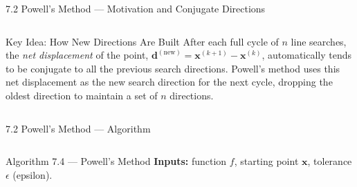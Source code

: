 \documentclass[aspectratio=169,10pt]{beamer}
\begin{document}
\begin{frame}[allowframebreaks]{7.2 Powell's Method --- Motivation and Conjugate Directions}
\begin{columns}[T]
      \begin{block}{Key Idea: How New Directions Are Built}
        After each full cycle of $n$ line searches, the \emph{net
        displacement} of the point,
        $\mathbf{d}^{(\text{new})} = \mathbf{x}^{(k+1)} - \mathbf{x}^{(k)}$,
        automatically tends to be conjugate to all the previous
        search directions.  Powell's method uses this net displacement
        as the new search direction for the next cycle, dropping the
        oldest direction to maintain a set of $n$ directions.
      \end{block}
  \end{columns}
\end{frame}

\begin{frame}[allowframebreaks]{7.2 Powell's Method --- Algorithm}
  \begin{columns}[T]
      \begin{alertblock}{Algorithm 7.4 --- Powell's Method}
        \textbf{Inputs:} function $f$, starting point $\mathbf{x}$,
        tolerance $\epsilon$ (epsilon).


\end{alertblock}
\end{columns}
\end{frame}
\end{document}
